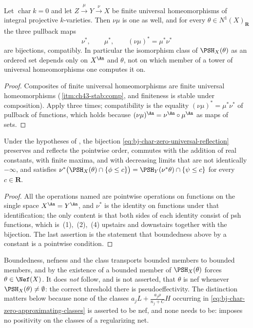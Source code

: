 \begin{corollary}
\label{cor:ch44-reflection-tower}
Let $\operatorname{char}k=0$ and let
$Z\xrightarrow{\ \mu\ }Y\xrightarrow{\ \nu\ }X$ be finite universal
homeomorphisms of integral projective $k$-varieties.  Then $\nu\mu$ is
one as well, and for every $\theta\in N^1(X)_{\mathbf R}$ the three
pullback maps
\[
 \nu^*,\qquad\mu^*,\qquad(\nu\mu)^*=\mu^*\nu^*
\]
are bijections, compatibly.  In particular the isomorphism class of
$\PSH_X(\theta)$ as an ordered set depends only on $X^{\An}$ and
$\theta$, not on which member of a tower of universal homeomorphisms one
computes it on.
\end{corollary}

\begin{proof}
Composites of finite universal homeomorphisms are finite universal
homeomorphisms (\,\cref{itm:ch43-stab:comp}, and
finiteness is stable under composition).  Apply
 three times; compatibility is the equality
$(\nu\mu)^*=\mu^*\nu^*$ of pullback of functions, which holds because
$(\nu\mu)^{\An}=\nu^{\An}\circ\mu^{\An}$ as maps of sets.
\end{proof}

\begin{corollary}
\label{cor:ch44-reflection-structure}
Under the hypotheses of , the
bijection \eqref{eq:bj-char-zero-universal-reflection} preserves and
reflects the pointwise order, commutes with the addition of real constants,
with finite maxima, and with decreasing limits that are not identically
$-\infty$, and satisfies
$\nu^*\bigl(\PSH_X(\theta)\cap\{\phi\le c\}\bigr)
 =\PSH_Y(\nu^*\theta)\cap\{\psi\le c\}$ for every $c\in\mathbf R$.
\end{corollary}

\begin{proof}
All the operations named are pointwise operations on functions on the single
space $X^{\An}=Y^{\An}$, and $\nu^*$ is the identity on functions under
that identification; the only content is that both sides of each identity
consist of psh functions, which is
\,(1),~(2),~(4) upstairs and downstairs together
with the bijection.  The last assertion is the statement that boundedness
above by a constant is a pointwise condition.
\end{proof}

\begin{warning}{Boundedness, nefness and the class}
\label{warn:ch44-nef-not-transported}
 transports bounded members to bounded
members, and by  the existence of a bounded
member of $\PSH_X(\theta)$ forces $\theta\in\Nef(X)$.  It does
\emph{not} follow, and is not asserted, that $\theta$ is nef whenever
$\PSH_X(\theta)\ne\emptyset$: the correct threshold there is
pseudoeffectivity.  The distinction matters below because none of the
classes $a_jL+\frac{a_j\rho}{n_j+C}H$ occurring in
\eqref{eq:bj-char-zero-approximating-classes} is asserted to be nef, and
none needs to be:  imposes no positivity on the classes of
a regularizing net.
\end{warning}

